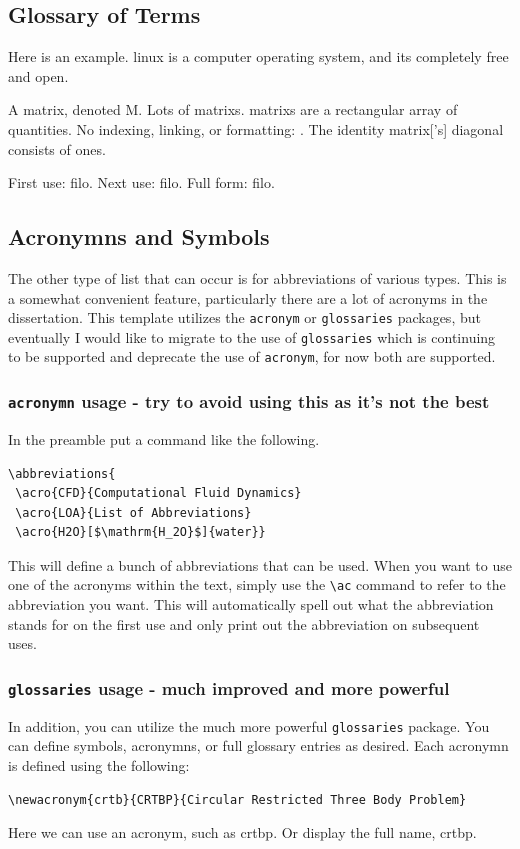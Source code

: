 \subsection{Glossary of Terms}\label{ssec:glossary}
Here is an example.
\Gls{linux} is a computer operating system, and its completely free and open.

A \gls{matrix}, denoted \gls{M}.
Lots of \glspl{matrix}.
\Glspl{matrix} are a rectangular array of quantities.
No indexing, linking, or formatting: .
The identity \gls{matrix}['s] diagonal consists of ones.

First use: \gls{filo}.
Next use: \gls{filo}.
Full form: \acrfull{filo}.


\subsection{Acronymns and Symbols}\label{ssec:acronymns}
The other type of list that can occur is for abbreviations of various types.  
This is a somewhat convenient feature, particularly there are a lot of acronyms in the dissertation.  
This template utilizes the \texttt{acronym} or \texttt{glossaries} packages, but eventually I would like to migrate to the use of \texttt{glossaries} which is continuing to be supported and deprecate the use of \texttt{acronym}, for now both are supported. 

\subsubsection{\texttt{acronymn} usage - try to avoid using this as it's not the best}
In the preamble put a command like the following.
\begin{verbatim}
\abbreviations{
 \acro{CFD}{Computational Fluid Dynamics}
 \acro{LOA}{List of Abbreviations}
 \acro{H2O}[$\mathrm{H_2O}$]{water}}
\end{verbatim}
This will define a bunch of abbreviations that can be used.  
When you want to use one of the acronyms within the text, simply use the \verb|\ac| command to refer to the abbreviation you want.
This will automatically spell out what the abbreviation stands for on the first use and only print out the abbreviation on subsequent uses.  

\subsubsection{\texttt{glossaries} usage - much improved and more powerful}
In addition, you can utilize the much more powerful \texttt{glossaries} package.
You can define symbols, acronymns, or full glossary entries as desired.
Each acronymn is defined using the following:
\begin{verbatim}
\newacronym{crtb}{CRTBP}{Circular Restricted Three Body Problem}
\end{verbatim}
Here we can use an acronym, such as \gls{crtbp}.
Or display the full name, \gls{crtbp}.

